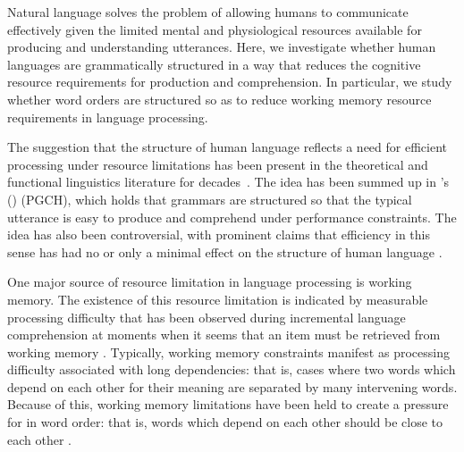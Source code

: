 

Natural language solves the problem of allowing humans to communicate effectively given the limited mental and physiological resources available for producing and understanding utterances. Here, we investigate whether human languages are grammatically structured in a way that reduces the cognitive resource requirements for production and comprehension. In particular, we study whether word orders are structured so as to reduce working memory resource requirements in language processing. 

The suggestion that the structure of human language reflects a need for efficient processing under resource limitations has been present in the theoretical and functional linguistics literature for decades~\citep{yngve1961,berwick1984grammatical,hawkins1994performance,jaeger2011language,gibson2019efficiency}. The idea has been summed up in \citeauthor{hawkins1994efficiency}'s (\citeyear{hawkins1994efficiency})  (PGCH), which holds that grammars are structured so that the typical utterance is easy to produce and comprehend under performance constraints.
The idea has also been controversial, with prominent claims that efficiency in this sense has had no or only a minimal effect on the structure of human language \citep{chomsky2005three}.

One major source of resource limitation in language processing is working memory. The existence of this resource limitation is indicated by measurable processing difficulty that has been observed during incremental language comprehension at moments when it seems that an item must be retrieved from working memory \citep{gibson1998syntactic,gibson1999memory,gibson2000dependency,mcelree,lewis2005activationbased,bartek2011search,nicenboim2015working}. Typically, working memory constraints manifest as processing difficulty associated with long dependencies: that is, cases where two words which depend on each other for their meaning are separated by many intervening words. Because of this, working memory limitations have been held to create a pressure for  in word order: that is, words which depend on each other should be close to each other \citep[for recent reviews of this idea, see][]{liu-dependency-2017,temperley-minimizing-2018}.

